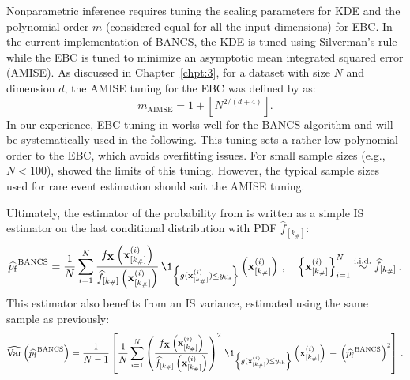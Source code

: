 Nonparametric inference requires tuning the scaling parameters for KDE and the polynomial order $m$ (considered equal for all the input dimensions) for EBC. 
In the current implementation of BANCS, the KDE is tuned using Silverman's rule\footnotemark~\citep{silverman_1981} while the EBC is tuned to minimize an asymptotic mean integrated squared error (AMISE). 
As discussed in Chapter~\ref{chpt:3}, for a dataset with size $N$ and dimension $d$, the AMISE tuning for the EBC was defined by \citet{sancetta_satchell_2004} as:
\begin{equation}\label{eq:amise_tuning}
    m_{\mathrm{AIMSE}} = 1 + \left\lfloor N^{2/(d+4)} \right\rfloor.
\end{equation}
In our experience, EBC tuning in  works well for the BANCS algorithm and will be systematically used in the following. 
This tuning sets a rather low polynomial order to the EBC, which avoids overfitting issues. 
For small sample sizes (e.g., $N<100$), \citet{segers_2017} showed the limits of this tuning. 
However, the typical sample sizes used for rare event estimation should suit the AMISE tuning. 


Ultimately, the estimator of the probability from  is written as a simple IS estimator on the last conditional distribution with PDF $\widehat{f}_{[k_\#]}$:
\begin{equation}
    \widehat{\pf}^{\mathrm{BANCS}} = \frac1N \sum_{i=1}^N \frac{f_\bX\left(\bx_{[k_\#]}^{(i)}\right)}{\widehat{f}_{[k_\#]}\left(\bx_{[k_\#]}^{(i)}\right)} \, \1_{\left\{g(\bx_{[k_\#]}^{(i)}) \leq \yth \right\}}\left(\bx_{[k_\#]}^{(i)}\right)\, , \quad \left\{\bx_{[k_\#]}^{(i)}\right\}_{i=1}^N  \overset{\text{i.i.d.}}{\sim} \widehat{f}_{[k_\#]} \, .
\end{equation}
This estimator also benefits from an IS variance, estimated using the same sample as previously:
\begin{equation}
    \what{\var}\left(\widehat{\pf}^{\mathrm{BANCS}}\right) = \frac{1}{N-1} \left[\frac1N \sum_{i=1}^N \left(\frac{f_\bX\left(\bx_{[k_\#]}^{(i)}\right)}{\widehat{f}_{[k_\#]}\left(\bx_{[k_\#]}^{(i)}\right)}\right)^2 \, \1_{\left\{g(\bx_{[k_\#]}^{(i)}) \leq \yth \right\}}\left(\bx_{[k_\#]}^{(i)}\right) \, - \, \left(\widehat{\pf}^{\mathrm{BANCS}}\right)^2\right]\, .
\end{equation}

